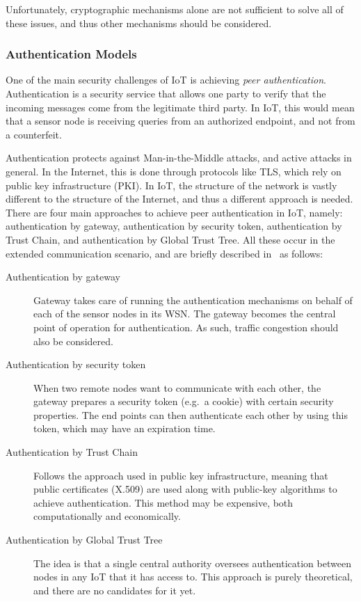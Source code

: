 \documentclass[12pt]{article}
\begin{document}
Unfortunately, cryptographic mechanisms alone are not sufficient to solve all of these issues, and thus other mechanisms should be considered.

\subsubsection{Authentication Models}

One of the main security challenges of IoT is achieving \emph{peer authentication}. Authentication is a security service that allows one party to verify that the incoming messages come from the legitimate third party. In IoT, this would mean that a sensor node is receiving queries from an authorized endpoint, and not from a counterfeit.

Authentication protects against Man-in-the-Middle attacks, and active attacks in general. In the Internet, this is done through protocols like TLS, which rely on public key infrastructure (PKI). In IoT, the structure of the network is vastly different to the structure of the Internet, and thus a different approach is needed. There are four main approaches to achieve peer authentication in IoT, namely: authentication by gateway, authentication by security token, authentication by Trust Chain, and authentication by Global Trust Tree. All these occur in the extended communication scenario, and are briefly described in~\cite{Zhang:2015} as follows:
\begin{description}
\item[Authentication by gateway] Gateway takes care of running the authentication mechanisms on behalf of each of the sensor nodes in its WSN. The gateway becomes the central point of operation for authentication. As such, traffic congestion should also be considered.
\item[Authentication by security token] When two remote nodes want to communicate with each other, the gateway prepares a security token (e.g.\ a cookie) with certain security properties. The end points can then authenticate each other by using this token, which may have an expiration time. 
\item[Authentication by Trust Chain] Follows the approach used in public key infrastructure, meaning that public certificates (X.509) are used along with public-key algorithms to achieve authentication. This method may be expensive, both computationally and economically.
\item[Authentication by Global Trust Tree] The idea is that a single central authority oversees authentication between nodes in any IoT that it has access to. This approach is purely theoretical, and there are no candidates for it yet.
\end{description}
\end{document}
